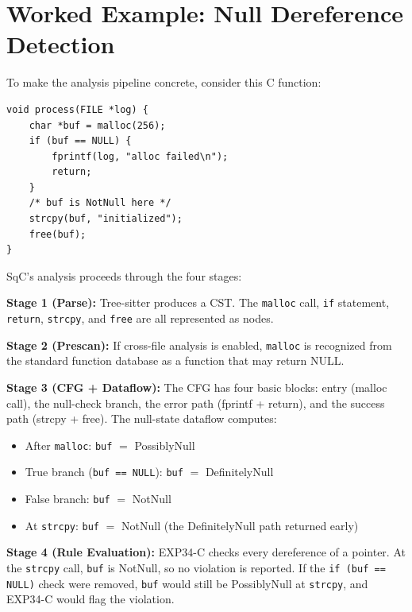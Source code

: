 \section{Worked Example: Null Dereference Detection}
\label{sec:worked-example}

To make the analysis pipeline concrete, consider this C function:

\begin{lstlisting}
void process(FILE *log) {
    char *buf = malloc(256);
    if (buf == NULL) {
        fprintf(log, "alloc failed\n");
        return;
    }
    /* buf is NotNull here */
    strcpy(buf, "initialized");
    free(buf);
}
\end{lstlisting}

SqC's analysis proceeds through the four stages:

\textbf{Stage 1 (Parse):} Tree-sitter produces a CST.  The
\texttt{malloc} call, \texttt{if} statement, \texttt{return},
\texttt{strcpy}, and \texttt{free} are all represented as nodes.

\textbf{Stage 2 (Prescan):} If cross-file analysis is enabled,
\texttt{malloc} is recognized from the standard function database
as a function that may return NULL.

\textbf{Stage 3 (CFG + Dataflow):} The CFG has four basic blocks:
entry (malloc call), the null-check branch, the error path (fprintf +
return), and the success path (strcpy + free).  The null-state dataflow
computes:
\begin{itemize}
    \item After \texttt{malloc}: \texttt{buf} $=$ PossiblyNull
    \item True branch (\texttt{buf == NULL}): \texttt{buf} $=$ DefinitelyNull
    \item False branch: \texttt{buf} $=$ NotNull
    \item At \texttt{strcpy}: \texttt{buf} $=$ NotNull (the DefinitelyNull
        path returned early)
\end{itemize}

\textbf{Stage 4 (Rule Evaluation):} EXP34-C checks every dereference
of a pointer.  At the \texttt{strcpy} call, \texttt{buf} is NotNull,
so no violation is reported.  If the \texttt{if (buf == NULL)} check
were removed, \texttt{buf} would still be PossiblyNull at \texttt{strcpy},
and EXP34-C would flag the violation.
